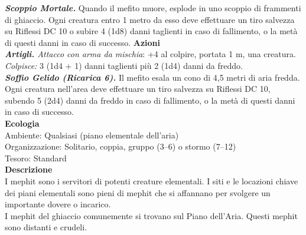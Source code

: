 \begin{multicols}{2}
\emph{\textbf{Scoppio Mortale.}} Quando il mefito muore, esplode in uno scoppio di frammenti di ghiaccio. Ogni creatura entro 1 metro da esso deve effettuare un tiro salvezza su Riflessi DC 10 o subire 4 (1d8) danni taglienti in caso di fallimento, o la metà di questi danni in caso di successo.
\smallskip\textbf{Azioni}\\
\emph{\textbf{Artigli.} Attacco con arma da mischia}: +4 al colpire, portata 1 m, una creatura.\\
\emph{Colpisce:} 3 (1d4 + 1) danni taglienti più 2 (1d4) danni da freddo.\\
\emph{\textbf{Soffio Gelido (Ricarica 6).}} Il mefito esala un cono di 4,5 metri di aria fredda. Ogni creatura nell'area deve effettuare un tiro salvezza su Riflessi DC 10, subendo 5 (2d4) danni da freddo in caso di fallimento, o la metà di questi danni in caso di successo.\\
\textbf{Ecologia}\\
Ambiente: Qualsiasi (piano elementale dell'aria)\\
Organizzazione: Solitario, coppia, gruppo (3–6) o stormo (7–12)\\
Tesoro: Standard\\
\textbf{Descrizione}\\
I mephit sono i servitori di potenti creature elementali. I siti e le locazioni chiave dei piani elementali sono pieni di mephit che si affannano per svolgere un importante dovere o incarico.\\

I mephit del ghiaccio comunemente si trovano sul Piano dell’Aria. Questi mephit sono distanti e crudeli.\\


\end{multicols}
